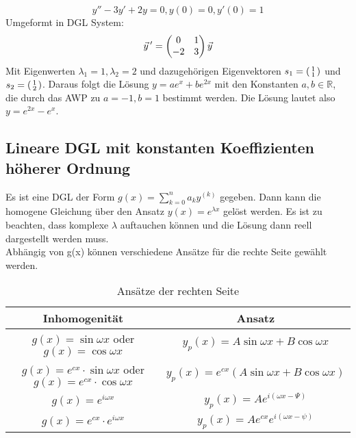 \begin{equation*}
    y''-3y'+2y=0, y(0)=0, y'(0)=1
\end{equation*}
Umgeformt in DGL System:
\begin{equation*}
    \vec y\,'=
    \begin{pmatrix}
    0  & 1 \\
    -2 & 3
    \end{pmatrix}
    \vec{y}
\end{equation*}
Mit Eigenwerten $\lambda_1=1, \lambda_2=2$ und dazugehörigen Eigenvektoren $s_1=\left(\begin{smallmatrix}1\\1\end{smallmatrix}\right)$ und $s_2=\left(\begin{smallmatrix}1\\2\end{smallmatrix}\right)$.
Daraus folgt die Lösung $y=ae^x+be^{2x}$ mit den Konstanten $a,b \in \mathbb{R}$, die durch das AWP zu $a=-1, b=1$ bestimmt werden. Die Lösung lautet also $y=e^{2x}-e^x$.


\subsection{Lineare DGL mit konstanten Koeffizienten höherer Ordnung}
Es ist eine DGL der Form $g(x)=\sum_{k=0}^na_ky^{(k)}$ gegeben. Dann kann die homogene Gleichung über den Ansatz $y(x)=e^{\lambda x}$ gelöst werden. Es ist zu beachten, dass komplexe $\lambda$ auftauchen können und die Lösung dann reell dargestellt werden muss.\\
Abhängig von g(x) können verschiedene Ansätze für die rechte Seite gewählt werden.

\begin{table}[h]
    \centering
    \caption{Ansätze der rechten Seite}
    \begin{tabular}{c|c}
        \textbf{Inhomogenität} & \textbf{Ansatz}  \\
        \hline
         $g(x)=\sin{\omega x}$ oder $g(x)=\cos{\omega x}$   & $y_p(x)=A\sin{\omega x} + B\cos{\omega x}$\\
         $g(x)=e^{cx}\cdot\sin{\omega x}$ oder $g(x)=e^{cx}\cdot\cos{\omega x}$     & $y_p(x)=e^{cx}(A\sin{\omega x} + B\cos{\omega x})$\\
         $g(x)=e^{i\omega x}$       & $y_p(x)=Ae^{i(\omega x - \Psi)}$\\
         $g(x)=e^{cx}\cdot e^{i\omega x}$       & $y_p(x)=Ae^{cx}e^{i(\omega x -\psi)}$\\
         
    \end{tabular}
    \label{tab:my_label}
\end{table}

